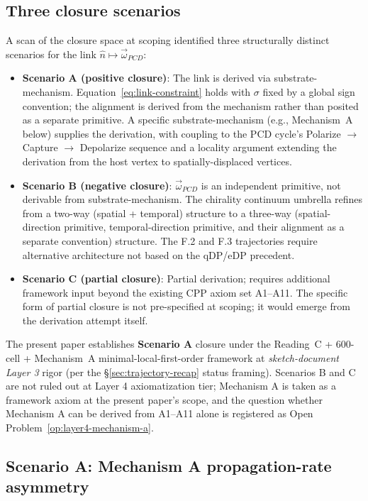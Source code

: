 \documentclass[11pt,letterpaper]{article}
\newcommand{\omegaPCD}{\vec{\omega}_{PCD}}
\begin{document}
\subsection{Three closure scenarios}
\label{sec:three-scenarios}

A scan of the closure space at scoping identified three structurally distinct scenarios for the link $\hat{n} \mapsto \omegaPCD$:

\begin{itemize}[leftmargin=2em]
\item \textbf{Scenario A (positive closure)}: The link is derived via substrate-mechanism. Equation~\eqref{eq:link-constraint} holds with $\sigma$ fixed by a global sign convention; the alignment is derived from the mechanism rather than posited as a separate primitive. A specific substrate-mechanism (e.g., Mechanism~A below) supplies the derivation, with coupling to the PCD cycle's Polarize $\to$ Capture $\to$ Depolarize sequence and a locality argument extending the derivation from the host vertex to spatially-displaced vertices.
\item \textbf{Scenario B (negative closure)}: $\omegaPCD$ is an independent primitive, not derivable from substrate-mechanism. The chirality continuum umbrella refines from a two-way (spatial + temporal) structure to a three-way (spatial-direction primitive, temporal-direction primitive, and their alignment as a separate convention) structure. The F.2 and F.3 trajectories require alternative architecture not based on the qDP/eDP precedent.
\item \textbf{Scenario C (partial closure)}: Partial derivation; requires additional framework input beyond the existing CPP axiom set A1--A11. The specific form of partial closure is not pre-specified at scoping; it would emerge from the derivation attempt itself.
\end{itemize}

The present paper establishes \textbf{Scenario A} closure under the Reading~C + 600-cell + Mechanism~A minimal-local-first-order framework at \emph{sketch-document Layer 3} rigor (per the \S\ref{sec:trajectory-recap} status framing). Scenarios B and C are not ruled out at Layer 4 axiomatization tier; Mechanism A is taken as a framework axiom at the present paper's scope, and the question whether Mechanism A can be derived from A1--A11 alone is registered as Open Problem~\ref{op:layer4-mechanism-a}.

\subsection{Scenario A: Mechanism A propagation-rate asymmetry}
\label{sec:scenario-a-mechanism-a}
\end{document}
